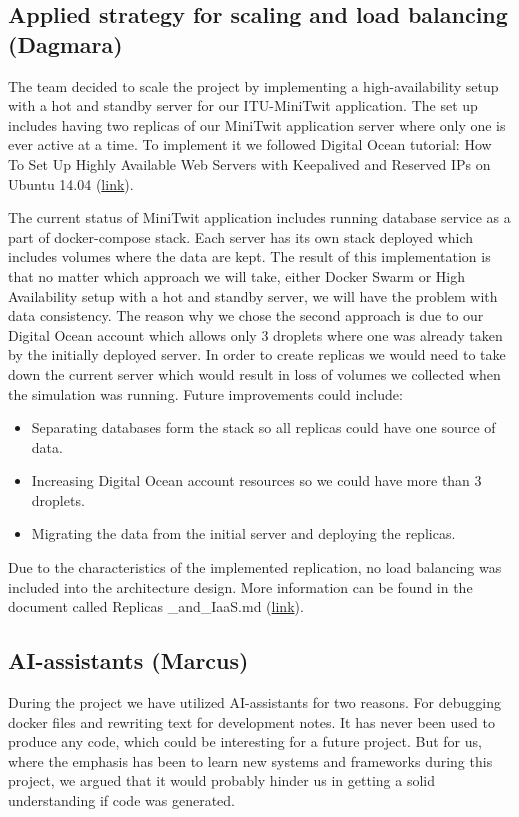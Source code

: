 \documentclass{article}
\begin{document}
\subsection{Applied strategy for scaling and load balancing (Dagmara)}
The team decided to scale the project by implementing a high-availability setup with a hot and standby server for our ITU-MiniTwit application. The set up includes having two replicas of our MiniTwit application server where only one is ever active at a time. To implement it we followed Digital Ocean tutorial: How To Set Up Highly Available Web Servers with Keepalived and Reserved IPs on Ubuntu 14.04 (\href{https://www.digitalocean.com/community/tutorials/how-to-set-up-highly-available-web-servers-with-keepalived-and-reserved-ips-on-ubuntu-14-04}{link}).

The current status of MiniTwit application includes running database service as a part of docker-compose stack. Each server has its own stack deployed which includes volumes where the data are kept. The result of this implementation is that no matter which approach we will take, either Docker Swarm or High Availability setup with a hot and standby server, we will have the problem with data consistency. The reason why we chose the second approach is due to our Digital Ocean account which allows only 3 droplets where one was already taken by the initially deployed server. In order to create replicas we would need to take down the current server which would result in loss of volumes we collected when the simulation was running. Future improvements could include:
\begin{itemize}
\item Separating databases form the stack so all replicas could have one source of data.
\item Increasing Digital Ocean account resources so we could have more than 3 droplets.
\item Migrating the data from the initial server and deploying the replicas.
\end{itemize}
Due to the characteristics of the implemented replication, no load balancing was included into the architecture design.
More information can be found in the document called Replicas \_and\_IaaS.md (\href{https://github.com/szymongalecki/ITU-MiniTwit/blob/replication/dev_notes/Replicas%20_and_IaaS.md}{link}).

\subsection{AI-assistants (Marcus)}
During the project we have utilized AI-assistants for two reasons. For debugging docker files and rewriting text for development notes. It has never been used to produce any code, which could be interesting for a future project. But for us, where the emphasis has been to learn new systems and frameworks during this project, we argued that it would probably hinder us in getting a solid understanding if code was generated.
\end{document}

